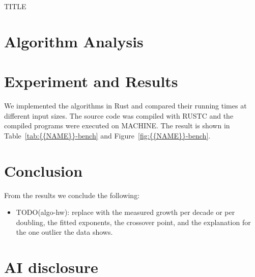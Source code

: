 \documentclass{article}
\begin{document}
\begin{center}
  \LARGE {{TITLE}}
\end{center}

\begin{abstract}
  {{ABSTRACT}}
\end{abstract}

\section{Algorithm Analysis}


\section{Experiment and Results}

We implemented the algorithms in Rust and compared their running times at
different input sizes. The source code was compiled with {{RUSTC}} and the
compiled programs were executed on {{MACHINE}}. The result is shown in
Table~\ref{tab:{{NAME}}-bench} and Figure~\ref{fig:{{NAME}}-bench}.






\section{Conclusion}

From the results we conclude the following: \begin{itemize}

  \item TODO(algo-hw): replace with the measured growth per decade or per
    doubling, the fitted exponents, the crossover point, and the explanation
    for the one outlier the data shows.

\end{itemize}

\section*{AI disclosure}
\end{document}
